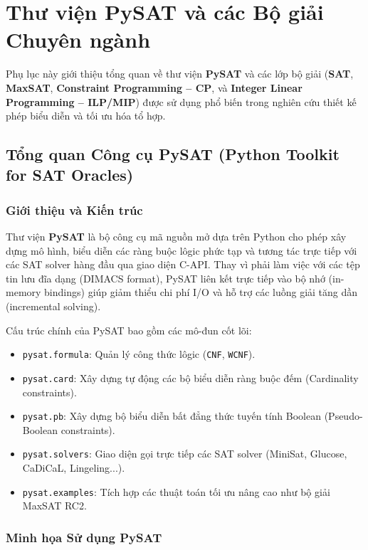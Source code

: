 \chapter{Thư viện PySAT và các Bộ giải Chuyên ngành}
\label{ch:appendix-solvers}

Phụ lục này giới thiệu tổng quan về thư viện \textbf{PySAT} và các lớp bộ giải (\textbf{SAT}, \textbf{MaxSAT}, \textbf{Constraint Programming -- CP}, và \textbf{Integer Linear Programming -- ILP/MIP}) được sử dụng phổ biến trong nghiên cứu thiết kế phép biểu diễn và tối ưu hóa tổ hợp.

\section{Tổng quan Công cụ PySAT (Python Toolkit for SAT Oracles)}

\subsection{Giới thiệu và Kiến trúc}

Thư viện \textbf{PySAT} \parencite{ignatiev2018pysat} là bộ công cụ mã nguồn mở dựa trên Python cho phép xây dựng mô hình, biểu diễn các ràng buộc lôgic phức tạp và tương tác trực tiếp với các SAT solver hàng đầu qua giao diện C-API. Thay vì phải làm việc với các tệp tin lưu đĩa dạng \CNF (DIMACS format), PySAT liên kết trực tiếp vào bộ nhớ (in-memory bindings) giúp giảm thiểu chi phí I/O và hỗ trợ các luồng giải tăng dần (incremental solving).

Cấu trúc chính của PySAT bao gồm các mô-đun cốt lõi:
\begin{itemize}
  \item \texttt{pysat.formula}: Quản lý công thức lôgic (\texttt{CNF}, \texttt{WCNF}).
  \item \texttt{pysat.card}: Xây dựng tự động các bộ biểu diễn ràng buộc đếm (Cardinality constraints).
  \item \texttt{pysat.pb}: Xây dựng bộ biểu diễn bất đẳng thức tuyến tính Boolean (Pseudo-Boolean constraints).
  \item \texttt{pysat.solvers}: Giao diện gọi trực tiếp các SAT solver (MiniSat, Glucose, CaDiCaL, Lingeling...).
  \item \texttt{pysat.examples}: Tích hợp các thuật toán tối ưu nâng cao như bộ giải MaxSAT \textsc{RC2}.
\end{itemize}

\subsection{Minh họa Sử dụng PySAT}


